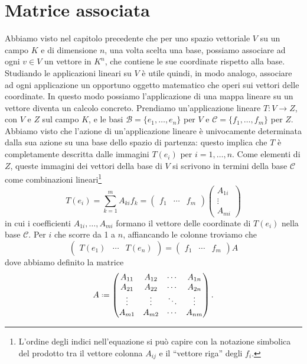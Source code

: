 \section{Matrice associata}
\label{sec:matrice-associata}
Abbiamo visto nel capitolo precedente che per uno spazio vettoriale $V$ su un campo $K$ e di dimensione $n$, una volta scelta una base, possiamo associare ad ogni $v\in V$ un vettore in $K^n$, che contiene le sue coordinate rispetto alla base.
Studiando le applicazioni lineari su $V$ è utile quindi, in modo analogo, associare ad ogni applicazione un opportuno oggetto matematico che operi sui vettori delle coordinate.
In questo modo possiamo l'applicazione di una mappa lineare su un vettore diventa un calcolo concreto.
Prendiamo un'applicazione lineare $T\colon V\to Z$, con $V$ e $Z$ sul campo $K$, e le basi $\mathcal B=\{e_1,\dots,e_n\}$ per $V$ e $\mathcal C=\{f_1,\dots,f_m\}$ per $Z$.
Abbiamo visto che l'azione di un'applicazione lineare è univocamente determinata dalla sua azione su una base dello spazio di partenza: questo implica che $T$ è completamente descritta dalle immagini $T(e_i)$ per $i=1,\dots,n$.
Come elementi di $Z$, queste immagini dei vettori della base di $V$ si scrivono in termini della base $\mathcal C$ come combinazioni lineari\footnote{
	L'ordine degli indici nell'equazione si può capire con la notazione simbolica del prodotto tra il vettore colonna $A_{ij}$ e il ``vettore riga'' degli $f_i$.
}
\begin{equation}
	T(e_i)=\sum_{k=1}^mA_{ki}f_k=
	\begin{pmatrix}
		f_1&\cdots&f_m
	\end{pmatrix}
	\begin{pmatrix}
		A_{1i}\\
		\vdots\\
		A_{mi}
	\end{pmatrix}
\end{equation}
in cui i coefficienti $A_{1i},\dots,A_{mi}$ formano il vettore delle coordinate di $T(e_i)$ nella base $\mathcal C$.
Per $i$ che scorre da 1 a $n$, affiancando le colonne troviamo che
\begin{equation}
	\begin{pmatrix}
		T(e_1)&\cdots&T(e_n)
	\end{pmatrix}
	=
	\begin{pmatrix}
		f_1&\cdots&f_m
	\end{pmatrix}
	A
\end{equation}
dove abbiamo definito la matrice
\begin{equation}
	A\defeq
	\begin{pmatrix}
		A_{11}&A_{12}&\cdots&A_{1n}\\
		A_{21}&A_{22}&\cdots&A_{2n}\\
		\vdots&\vdots&\ddots&\vdots\\
		A_{m1}&A_{m2}&\cdots&A_{nm}
	\end{pmatrix}.
	\label{eq:matrice-associata}
\end{equation}
